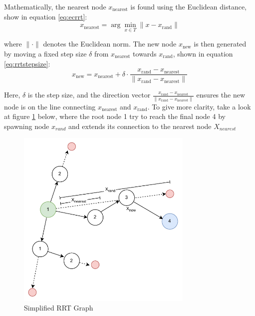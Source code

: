\documentclass[12pt]{report}
\begin{document}
        Mathematically, the nearest node \( x_{\text{nearest}} \) is found using the Euclidean distance, show in
        equation \ref{eq:ecrrt}:
        \begin{equation}\label{eq:ecrrt}
            x_{\text{nearest}} = \arg \min_{x \in T} \| x - x_{\text{rand}} \|
        \end{equation}

        where \( \| \cdot \| \) denotes the Euclidean norm. The new node \( x_{\text{new}} \) is then generated by
        moving a fixed step size \( \delta \) from \( x_{\text{nearest}} \) towards \( x_{\text{rand}} \), shown in
        equation \ref{eq:rrtstepsize}:
        \begin{equation}\label{eq:rrtstepsize}
            x_{\text{new}} = x_{\text{nearest}} + \delta \cdot \frac{x_{\text{rand}} - x_{\text{nearest}}}{\| x_{\text{rand}} - x_{\text{nearest}} \|}
        \end{equation}

        Here, \( \delta \) is the step size, and the direction vector \( \frac{x_{\text{rand}} - x_{\text{nearest}}}{\|
        x_{\text{rand}} - x_{\text{nearest}} \|} \) ensures the new node is on the line connecting \( x_{\text{nearest}}
        \) and \( x_{\text{rand}} \). To give more clarity, take a look at figure \ref{fig:rrt} below, where the root
        node 1 try to reach the final node 4 by spawning node \(x_{rand}\) and extends its connection to the nearest
        node \(X_{nearest}\)

        \begin{figure}[H]
            \centering
            \includegraphics[width=0.75\textwidth]{General Image/OSM Drone-RRT.pdf}
            \caption{Simplified RRT Graph}
            \label{fig:rrt}
        \end{figure}
\end{document}
